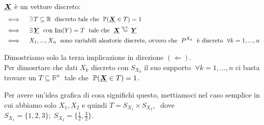 \begin{teorema}
\label{th:11.3}
    $\underline{{\boldsymbol{X}}}$ è un vettore discreto:
    \begin{align*}
        & \iff \quad \exists\,T\subseteq\mathbb{R}\;\text{ discreto tale che }\; \mathbb{P}(\underline{{\boldsymbol{X}}}\in T) = 1\\
        & \iff \quad \exists\,\underline{{\boldsymbol{Y}}}\;\text{ con Im}(Y)=T\;\text{ tale che }\; \underline{{\boldsymbol{X}}}\overset{\text{q.c.}}{=}\underline{{\boldsymbol{Y}}}\\
        & \iff \quad X_1, ..., X_n\;\text{ sono variabili aleatorie discrete, ovvero che }\;P^{X_k}\;\text{ è discreto }\;\forall k=1, ..., n
    \end{align*}
    \begin{dimostrazione}
        Dimostriamo solo la terza implicazione in direzione $(\Leftarrow)$.\\
        Per dimosrtare che dati $X_k$ discreto con $S_{X_k}$ il suo supporto $\;\forall k=1, ..., n$ ci basta trovare un $T\subseteq\mathbb{R}^n\;$ tale che $\;\mathbb{P}(\underline{{\boldsymbol{X}}}\in T)=1$.

        \medskip
        \noindent Per avere un'idea grafica di cosa significhi questo, mettiamoci nel caso semplice in cui abbiamo solo $X_1, X_2$ e quindi $T=S_{X_1}\times S_{X_2}, \;$ dove $S_{X_1} = \{1, 2, 3\};\;S_{X_2} = \{\frac{1}{2}, \frac{3}{2}\}$.
        \begin{figure}[H]
\centering
{}
\end{figure}


\end{dimostrazione}
\end{teorema}
